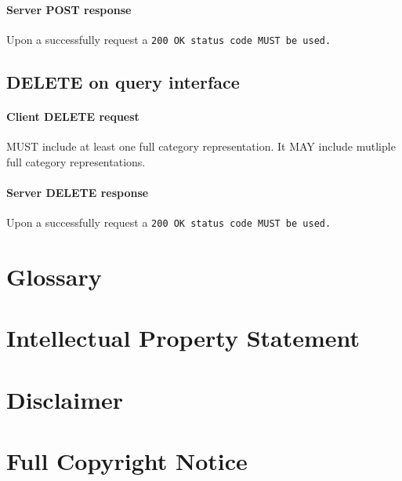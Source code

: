 \documentclass[10pt,a4paper]{article}
\begin{document}
\paragraph{Server POST response}
Upon a successfully request a \tt{200 OK} status code MUST be used.

\subsection{DELETE on query interface}

\paragraph{Client DELETE request}
MUST include at least one full category representation. It MAY include mutliple full category representations.

\paragraph{Server DELETE response}
Upon a successfully request a \tt{200 OK} status code MUST be used.

\section{Glossary}
\label{sec:glossary}


%

\section{Intellectual Property Statement}


\section{Disclaimer}


\section{Full Copyright Notice}




\end{document}
